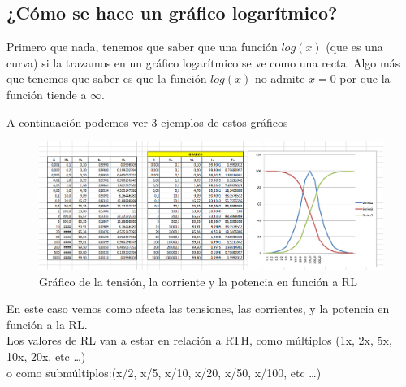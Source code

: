 \documentclass[../main.tex]{subfiles}
\begin{document}
	\subsection{¿Cómo se hace un gráfico logarítmico?}
	Primero que nada, tenemos que saber que una función $log(x)$ (que es una curva)
	si la trazamos en un gráfico logarítmico se ve como una recta.
	Algo más que tenemos que saber es que la función $log(x)$ no admite $x=0$
	por que la función tiende a $\infty$.

	A continuación podemos ver 3 ejemplos de estos gráficos
	\begin{figure}[H]
		\centering
		\includegraphics[width=\textwidth]{imagen2.png}
		\caption{Gráfico de la tensión, la corriente y la potencia en función a RL}
		\centering
	\end{figure}


	En este caso vemos como afecta las tensiones, las corrientes, y la potencia
	en función a la RL.\\

	Los valores de RL van a estar en relación a RTH,
	como múltiplos (1x, 2x, 5x, 10x, 20x, etc \ldots{})\\
	o como submúltiplos:(x/2, x/5, x/10, x/20, x/50, x/100, etc \ldots{})
\end{document}
